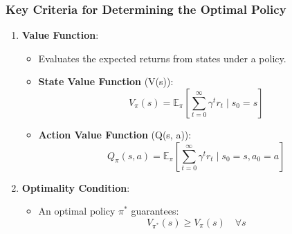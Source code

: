 \documentclass[aspectratio=169]{beamer}
\begin{document}
\begin{frame}[fragile]
    \frametitle{Key Criteria for Determining the Optimal Policy}
    \begin{enumerate}
        \item \textbf{Value Function}:
            \begin{itemize}
                \item Evaluates the expected returns from states under a policy.
                \item \textbf{State Value Function} (V(s)):
                    \begin{equation}
                    V_{\pi}(s) = \mathbb{E}_{\pi} \left[ \sum_{t=0}^{\infty} \gamma^t r_t \mid s_0 = s \right]
                    \end{equation}
                \item \textbf{Action Value Function} (Q(s, a)):
                    \begin{equation}
                    Q_{\pi}(s, a) = \mathbb{E}_{\pi} \left[ \sum_{t=0}^{\infty} \gamma^t r_t \mid s_0 = s, a_0 = a \right]
                    \end{equation}
            \end{itemize}
        \item \textbf{Optimality Condition}:
            \begin{itemize}
                \item An optimal policy $\pi^*$ guarantees:
                    \begin{equation}
                    V_{\pi^*}(s) \geq V_{\pi}(s) \quad \forall s
                    \end{equation}
            \end{itemize}
    \end{enumerate}
\end{frame}
\end{document}
